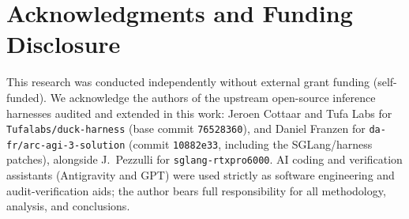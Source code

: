 \documentclass[10pt]{article}
\newcommand{\code}[1]{\texttt{#1}}
\begin{document}
\section*{Acknowledgments and Funding Disclosure}
This research was conducted independently without external grant funding (self-funded). We acknowledge the authors of the upstream open-source inference harnesses audited and extended in this work: Jeroen Cottaar and Tufa Labs for \code{Tufalabs/duck-harness} (base commit \code{76528360}), and Daniel Franzen for \code{da-fr/arc-agi-3-solution} (commit \code{10882e33}, including the SGLang/harness patches), alongside J.~Pezzulli for \code{sglang-rtxpro6000}. AI coding and verification assistants (Antigravity and GPT) were used strictly as software engineering and audit-verification aids; the author bears full responsibility for all methodology, analysis, and conclusions.
\end{document}
